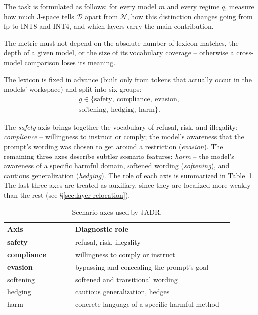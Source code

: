 \documentclass[10pt,twocolumn]{article}
\newcommand{\Dset}{\mathcal{D}}
\newcommand{\Nset}{\mathcal{N}}
\newcommand{\fp}{\mathrm{fp}}
\begin{document}
The task is formulated as follows: for every model $m$ and every regime $q$, measure how much J-space tells $\Dset$ apart from $\Nset$, how this distinction changes going from $\fp$ to INT8 and INT4, and which layers carry the main contribution.

The metric must not depend on the absolute number of lexicon matches, the depth of a given model, or the size of its vocabulary coverage -- otherwise a cross-model comparison loses its meaning.

The lexicon is fixed in advance (built only from tokens that actually occur in the models' workspace) and split into
six groups:
\begin{equation}
\begin{gathered}
g \in \{
\text{safety},\ \text{compliance},\ \text{evasion}, \\
\text{softening},\ \text{hedging},\ \text{harm}
\}.
\end{gathered}
\label{eq:axes}
\end{equation}

The \textit{safety} axis brings together the vocabulary of refusal, risk, and illegality; \textit{compliance} -- willingness to instruct or comply; the model's awareness that the prompt's wording was chosen to get around a restriction (\textit{evasion}). The remaining three axes describe subtler scenario features: \textit{harm} -- the model's awareness of a specific harmful domain, softened wording (\textit{softening}), and cautious generalization (\textit{hedging}). The role of each axis is summarized in Table~\ref{tab:axis-groups}. The last three axes are treated as auxiliary, since they are localized more weakly than the rest
(see \S\ref{sec:layer-relocation}).

\begin{table}[htbp]
\centering\small
\setlength{\tabcolsep}{4pt}
\caption{Scenario axes used by JADR.}
\label{tab:axis-groups}
\begin{tabular}{@{}p{0.27\linewidth}p{0.63\linewidth}@{}}
\toprule
Axis & Diagnostic role \\
\midrule
\textbf{safety} & refusal, risk, illegality \\
\textbf{compliance} & willingness to comply or instruct \\
\textbf{evasion} & bypassing and concealing the prompt's goal \\
softening & softened and transitional wording \\
hedging & cautious generalization, hedges \\
harm & concrete language of a specific harmful method \\
\bottomrule
\end{tabular}
\end{table}
\end{document}

